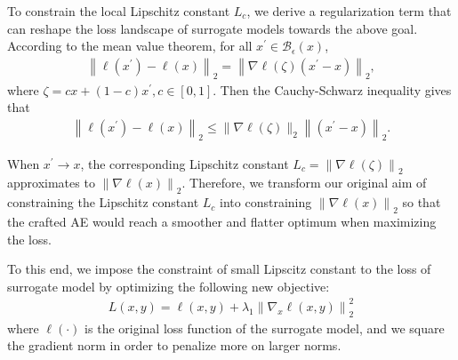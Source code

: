 \documentclass[letterpaper]{article} %
\theoremstyle{plain}
\theoremstyle{definition}
\begin{document}
To constrain the local Lipschitz constant $L_c$, we derive a regularization term that can reshape the loss landscape of surrogate models towards the above goal. According to the mean value theorem, for all $x^{\prime} \in \mathcal{B}_\epsilon(x)$,
\begin{align}
\left\|\ell\left({x}^{\prime}\right)-\ell\left({x}\right)\right\|_2 = \left\|\nabla \ell({\zeta})\left({x}^{\prime}-{x}\right)\right\|_2,
\end{align}
where ${\zeta}=c {x}+(1-c) {x}^{\prime}, c \in[0,1]$. Then the Cauchy-Schwarz inequality gives that
\begin{align}
\left\|\ell\left({x}^{\prime}\right)-\ell\left({x}\right)\right\|_2 \leq\|\nabla \ell({\zeta})\|_2\left\|\left({x}^{\prime}-{x}\right)\right\|_2.
\end{align}

When $x^{\prime} \rightarrow x$, the corresponding Lipschitz constant $L_c=\left\|\nabla \ell({\zeta})\right\|_2$ approximates to $\left\|\nabla \ell\left({x}\right)\right\|_2$. Therefore, we transform our original aim of constraining the Lipschitz constant $L_c$ into constraining $\left\|\nabla \ell\left({x}\right)\right\|_2$ so that the crafted AE would reach a smoother and flatter optimum when maximizing the loss.

To this end, we impose the constraint of small Lipscitz constant to the loss of surrogate model by optimizing the following new objective:
\begin{align}\label{eq:L1}
L({x, y}) = \ell(x, y) + \lambda_1\left\|\nabla_x \ell(x, y)\right\|_{2}^{2}
\end{align}
where $\ell(\cdot)$ is the original loss function of the surrogate model, and we square the gradient norm in order to penalize more on larger norms.
\end{document}
